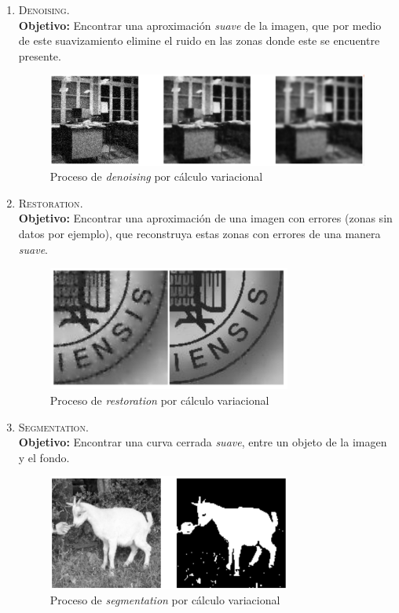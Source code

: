 \documentclass[letter, 11pt]{article}
\begin{document}
\begin{enumerate}
    \item \textsc{Denoising}. \\ \textbf{Objetivo:} Encontrar una aproximación \textit{suave} de la imagen, que por medio de este suavizamiento elimine el ruido en las zonas donde este se encuentre presente.
    \begin{figure}[htpb!]
    \centering
    \includegraphics[width=11cm]{denoising}
    \caption{Proceso de \textit{denoising} por cálculo variacional}
    \label{fig:dendro}
    \end{figure}

    \item \textsc{Restoration}. \\ \textbf{Objetivo:} Encontrar una aproximación de una imagen con errores (zonas sin datos por ejemplo), que reconstruya estas zonas con errores de una manera \textit{suave}.
    \begin{figure}[htpb!]
    \centering
    \includegraphics[width=8cm]{restoration}
    \caption{Proceso de \textit{restoration} por cálculo variacional}
    \label{fig:dendro}
    \end{figure}

    \item \textsc{Segmentation}. \\ \textbf{Objetivo:} Encontrar una curva cerrada \textit{suave}, entre un objeto de la imagen y el fondo.
     \begin{figure}[htpb!]
    \centering
    \includegraphics[width=8cm]{segmentation}
    \caption{Proceso de \textit{segmentation} por cálculo variacional}
    \label{fig:dendro}
    \end{figure}


\end{enumerate}
\end{document}
